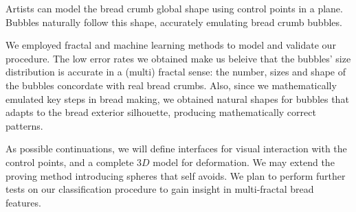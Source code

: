 \documentclass[final,5p,times]{elsarticle}
\begin{document}
Artists can model the bread crumb global shape using control points in a plane. Bubbles naturally follow this shape, accurately emulating bread crumb bubbles.

We employed fractal and machine learning methods to model and validate our procedure. The low error rates we obtained make us beleive that the bubbles' size distribution is accurate in a (multi) fractal sense: the number, sizes and shape of the bubbles concordate with real bread crumbs. Also, since we mathematically emulated key steps in bread making, we obtained natural shapes for bubbles that adapts to the bread exterior silhouette, producing mathematically correct patterns.

As possible continuations, we will define interfaces for visual interaction with the control points, and a complete $3D$ model for deformation. We may extend the proving method introducing spheres that self avoids. We plan to perform further tests on our classification procedure to gain insight in multi-fractal bread features.














\end{document}

